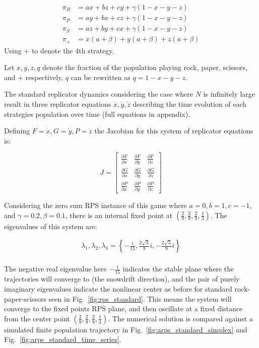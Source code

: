 \documentclass[%
 reprint,
 amsmath,amssymb,
 aps,
]{revtex4-2}
\begin{document}
\begin{align}
    \pi_R &= a x + b z + c y + \gamma (1 - x - y - z) \nonumber \\
    \pi_P &= a y + b x + c z + \gamma (1 - x - y - z) \nonumber \\
    \pi_S &= a z + b y + c x + \gamma (1- x - y - z)\nonumber  \\
    \pi_+ &= x (a + \beta) + y (a + \beta) + z (a + \beta)\nonumber 
\end{align}
Using $+$ to denote the 4th strategy.

Let $x,y,z, q$ denote the fraction of the population playing rock, paper, scissors, and $+$ respectively, 
$q$ can be rewritten as $q = 1-x-y-z$.

The standard replicator dynamics \cite{evolution_pop_dynamics} 
considering the case where $N$ is infinitely large result in three 
replicator equations $\dot{x}, \dot{y}, \dot{z}$ describing the time
evolution of each strategies population over time (full equations in appendix). 


Defining $F = \dot{x}, G = \dot{y}, P = \dot{z}$ the Jacobian for this system of replicator equations is:

\begin{equation}
J = 
\begin{bmatrix}
\frac{\partial F}{\partial x} & \frac{\partial F}{\partial y} &\frac{\partial F}{\partial z} \\[6pt]
\frac{\partial G}{\partial x} & \frac{\partial G}{\partial y} &\frac{\partial G}{\partial z} \\[6pt]
\frac{\partial P}{\partial x} & \frac{\partial P}{\partial y} & \frac{\partial P}{\partial z}
\end{bmatrix}
\end{equation}


Considering the zero sum RPS instance of this game where
$a = 0, b=1, c= -1$, and $\gamma = 0.2, \beta = 0.1$, 
there is an internal fixed point at $\left(\frac{2}{9},\frac{2}{9},\frac{2}{9},\frac{1}{3}\right)$.
The eigenvalues of this system are:

\begin{align}
\lambda_1, \lambda_2, \lambda_3 = \left\{-\frac{1}{15}, 
\frac{2\sqrt{3}}{9}i, -\frac{2\sqrt{3}}{9}i
\right\} \nonumber\\
\end{align}

The negative real eigenvalue here $-\frac{1}{15}$ indicates the 
stable plane where the trajectories will converge to (the snowdrift direction), and 
the pair of purely imaginary eigenvalues indicate the nonlinear center as 
before for standard rock-paper-scissors seen in Fig.~\ref{fig:rps_standard}.
This means the system will converge to the fixed points RPS plane, and then 
oscillate at a fixed distance from the center point
$\left(\frac{2}{9},\frac{2}{9},\frac{2}{9},\frac{1}{3}\right)$. The numerical solution is compared 
against a simulated finite population trajectory in Fig.~\ref{fig:arps_standard_simplex} and 
Fig.~\ref{fig:arps_standard_time_series}.
\end{document}
